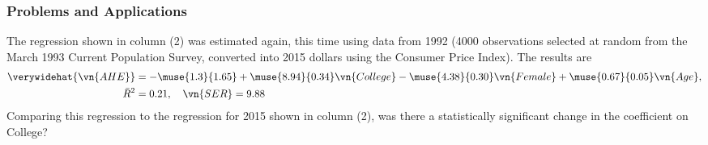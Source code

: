

\begin{frame}
\frametitle{Problems and Applications}
The regression shown in column (2) was estimated again, this time using data from 1992 (4000 observations selected at random from the March 1993 Current Population Survey, converted into 2015 dollars using the Consumer Price Index). The results are
\begin{align*}
\verywidehat{\vn{AHE}} 
  & = -\muse{1.3}{1.65} 
    + \muse{8.94}{0.34} \vn{College} 
    - \muse{4.38}{0.30} \vn{Female} 
    + \muse{0.67}{0.05} \vn{Age},\\
    \quad \bar{R}^2 
  & = 0.21,
    \quad \vn{SER} = 9.88
\end{align*}
Comparing this regression to the regression for 2015 shown in column (2), was there a statistically significant change in the coefficient on College?
\end{frame}

